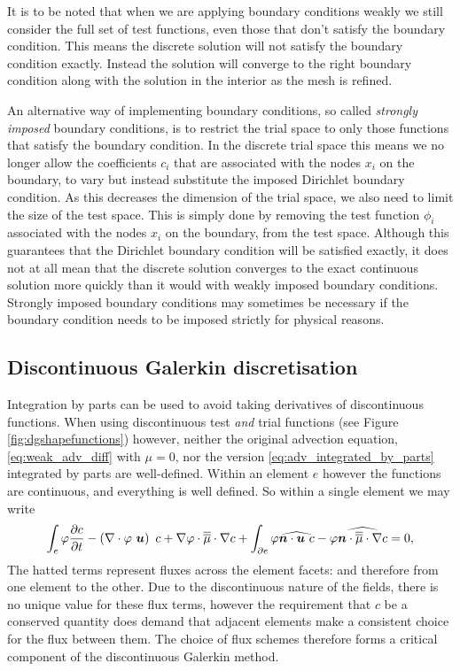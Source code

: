 It is to be noted that when we are applying boundary conditions weakly we
still consider the full set of test functions, even those that don't satisfy
the boundary condition. This means the discrete solution will not satisfy
the boundary condition exactly. Instead the solution will converge to the
right boundary condition along with the solution in the interior as the mesh
is refined.

 An alternative way of
implementing boundary conditions, so called \emph{strongly imposed} boundary
conditions, is to restrict the trial space to only those functions that
satisfy the boundary condition. In the discrete trial space this means we no
longer allow the coefficients $c_i$ that are associated with the nodes $x_i$
on the boundary, to vary but instead substitute the imposed Dirichlet
boundary condition. As this decreases the dimension of the trial space, we
also need to limit the size of the test space. This is simply done by
removing the test function $\phi_i$ associated with the nodes $x_i$ on the
boundary, from the test space. Although this guarantees that the Dirichlet
boundary condition will be satisfied exactly, it does not at all mean that
the discrete solution converges to the exact continuous solution more
quickly than it would with weakly imposed boundary conditions. Strongly
imposed boundary conditions may sometimes be necessary if the boundary
condition needs to be imposed strictly for physical reasons.

\subsection{Discontinuous Galerkin discretisation}\label{sec:NM_DG_advection}

Integration by parts can be used to avoid taking
derivatives of discontinuous functions.
When using discontinuous test \emph{and} trial functions (see Figure \ref{fig:dgshapefunctions}) however,
neither the original advection equation, \eqref{eq:weak_adv_diff} with $\mu=0$,
nor the version \eqref{eq:adv_integrated_by_parts} integrated by parts are well-defined.
Within an element $e$ however the functions are continuous, and everything is well defined. So within
a single element we may write
\begin{equation}\label{eq:adv_diff_dg}
  \int_e \varphi \frac{\partial c}{\partial t} -
    \left(\nabla\cdot \varphi~{\mbox{\boldmath$u$}}\right)~c +
    \nabla\varphi\cdot\overline{\overline{\mu}}\cdot\nabla c +
    \int_{\partial e} \varphi\widehat{{\mbox{\boldmath$n$}}\cdot{\mbox{\boldmath$u$}}~c} -
    \varphi\widehat{{\mbox{\boldmath$n$}}\cdot\overline{\overline{\mu}}\cdot\nabla c}
    = 0,
\end{equation}
The hatted terms represent fluxes across the element facets: and therefore
from one element to the other. Due to the discontinuous nature of the
fields, there is no unique value for these flux terms, however the
requirement that $c$ be a conserved quantity does demand that adjacent
elements make a consistent choice for the flux between them. The choice of flux
schemes therefore forms a critical component of the discontinuous Galerkin
method.

